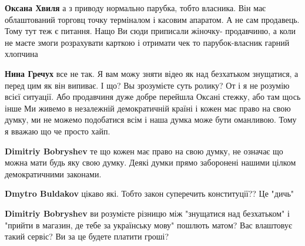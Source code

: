 \begin{itemize}
\begin{itemize}
\textbf{Оксана Хвиля} а з приводу нормально парубка, тобто власника. Він має
облаштований торговц точку терміналом і касовим апаратом. А не сам продавець.
Тому тут теж є питання. Нащо Ви сюди приписали жіночку- продавчиню, а коли не
маєте змоги розрахувати карткою і отримати чек то парубок-власник гарний
хлопчина

 
\textbf{Нина Гречух} все не так. Я вам можу зняти відео як над безхатьком
знущатися, а перед цим як він випиває. І що? Вы зрозумієте суть ролику? От і я
не розумію всієї ситуації. Або продавчиня дуже добре перейшла Оксані стежку,
або там щось інше Ми живемо в незалежній демократичній країні і кожен має право
на свою думку, ми не можемо подобатися всім і наша думка може бути оманливою.
Тому я вважаю що че просто хайп.

 
\textbf{Dimitriy Bobryshev} те що кожен має право на свою думку, не означає що можна мати будь яку свою думку. Деякі думки прямо заборонені нашими цілком демократичними законами.

 
\textbf{Dmytro Buldakov} цікаво які. Тобто закон суперечить конституції??
Це "дичь"

 
\textbf{Dimitriy Bobryshev} ви розумієте різницю між "знущатися над безхатьком" і "прийти в магазин, де тебе за українську мову" пошлють матом? Вас влаштовує такий сервіс? Ви за це будете платити гроші?


\end{itemize}
\end{itemize}
